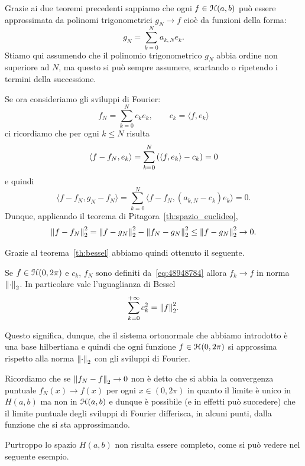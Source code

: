 Grazie ai due teoremi precedenti sappiamo che ogni $f\in \mathcal H(a,b)$ può essere
approssimata da polinomi trigonometrici $g_N\to f$
cioè da funzioni della forma:
\[
  g_N = \sum_{k=0}^{N} a_{k,N} e_k.
\]
Stiamo qui assumendo che il polinomio trigonometrico $g_N$ abbia ordine non superiore
ad $N$, ma questo si può sempre assumere, scartando
o ripetendo i termini della successione.

Se ora consideriamo gli sviluppi di Fourier:
\begin{equation}\label{eq:48948784}
  f_N = \sum_{k=0}^N c_k e_k, \qquad c_k = \langle f,e_k\rangle
\end{equation}
ci ricordiamo che per ogni $k\le N$ risulta
\[
   \langle f-f_N, e_k \rangle
   = \sum_{k=0}^N {\left( \langle f,e_k\rangle - c_k \right)} = 0
\]
e quindi
\[
  \langle f-f_N , g_N -f_N\rangle
  = \sum_{k=0}^N \langle f-f_N, (a_{k,N}-c_k) e_k \rangle
  = 0.
\]
Dunque, applicando il teorema di Pitagora~\ref{th:spazio_euclideo},
\[
  {\left\Vert f-f_N\right\Vert}_2^2 = {\left\Vert f-g_N\right\Vert}_2^2 - {\left\Vert f_N-g_N\right\Vert}_2^2
  \le {\left\Vert f-g_N\right\Vert}_2^2 \to 0.
\]

Grazie al teorema~\ref{th:bessel} abbiamo quindi ottenuto il seguente.
\begin{theorem}
Se $f\in \mathcal H(0,2\pi)$ e $c_k$, $f_N$
sono definiti da~\eqref{eq:48948784}
allora $f_k\to f$ in norma ${\left\Vert \cdot\right\Vert}_2$.
In particolare vale l'uguaglianza di Bessel
\begin{equation}\label{eq:uguaglianza_Bessel}
  \sum_{k=0}^{+\infty} c_k^2 = {\left\Vert f\right\Vert}_2^2.
\end{equation}
\end{theorem}


Questo significa, dunque, che il sistema ortonormale che abbiamo introdotto
è una base hilbertiana e quindi che ogni funzione $f\in \mathcal H(0,2\pi)$
si approssima
rispetto alla norma ${\left\Vert \cdot \right\Vert}_2$ con gli sviluppi di Fourier.

Ricordiamo che se ${\left\Vert f_N-f\right\Vert}_2 \to 0$ non è detto che si abbia la convergenza
puntuale $f_N(x)\to f(x)$ per ogni $x\in (0,2\pi)$ in quanto il limite è unico
in $H(a,b)$ ma non in $\mathcal H(a,b)$ e dunque è possibile (e in effetti può succedere)
che il limite puntuale degli sviluppi di Fourier differisca, in alcuni punti,
dalla funzione che si sta approssimando.

Purtroppo lo spazio $H(a,b)$ non risulta essere
completo, come si può vedere nel seguente esempio.

